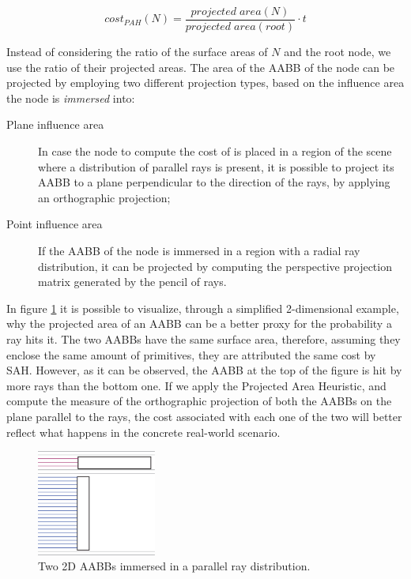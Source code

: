 \documentclass[acmtog, anonymous, review]{acmart}
\begin{document}
\begin{equation}
  cost_{PAH}(N) = \frac{projected\;area(N)}{projected\;area(root)} \cdot t
  \label{eq:pah}
\end{equation}

Instead of considering the ratio of the surface areas of $N$ and the root node, we use the ratio of their projected areas. The area of the AABB of the node can be projected by employing two different projection types, based on the influence area the node is \textit{immersed} into:

\begin{description}
  \item[Plane influence area] In case the node to compute the cost of is placed in a region of the scene where a distribution of parallel rays is present, it is possible to project its AABB to a plane perpendicular to the direction of the rays, by applying an orthographic projection;
  \item[Point influence area] If the AABB of the node is immersed in a region with a radial ray distribution, it can be projected by computing the perspective projection matrix generated by the pencil of rays.
\end{description}

In figure \ref{fig:aabbs_in_ray_distr} it is possible to visualize, through a simplified 2-dimensional example, why the projected area of an AABB can be a better proxy for the probability a ray hits it. The two AABBs have the same surface area, therefore, assuming they enclose the same amount of primitives, they are attributed the same cost by SAH. However, as it can be observed, the AABB at the top of the figure is hit by more rays than the bottom one. If we apply the Projected Area Heuristic, and compute the measure of the orthographic projection of both the AABBs on the plane parallel to the rays, the cost associated with each one of the two will better reflect what happens in the concrete real-world scenario.

\begin{figure}
  \centering
  \includegraphics[width=0.35\textwidth]{Images/rays_parallel_hit_prob.png}
  \caption{Two 2D AABBs immersed in a parallel ray distribution.}
  \label{fig:aabbs_in_ray_distr} 
\end{figure}
\end{document}
